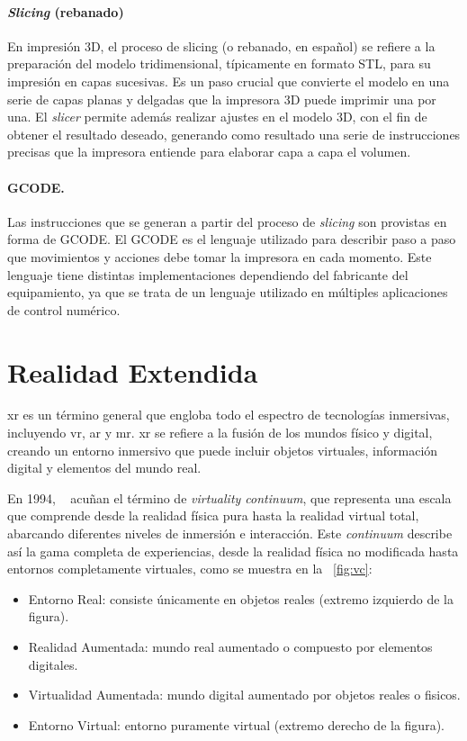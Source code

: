 \paragraph{\emph{Slicing} (rebanado)}

En impresión 3D, el proceso de slicing (o rebanado, en español) se refiere a la preparación del modelo tridimensional, típicamente en formato STL, para su impresión en capas sucesivas. Es un paso crucial que convierte el modelo en una serie de capas planas y delgadas que la impresora 3D puede imprimir una por una.
El \emph{slicer} permite además realizar ajustes en el modelo 3D, con el fin de obtener el resultado deseado, generando como resultado una serie de instrucciones precisas que la impresora entiende para elaborar capa a capa el volumen.

\paragraph{GCODE.} Las instrucciones que se generan a partir del proceso de \emph{slicing} son provistas en forma de GCODE. El GCODE es el lenguaje utilizado para describir paso a paso que movimientos y acciones debe tomar la impresora en cada momento. Este lenguaje tiene distintas implementaciones dependiendo del fabricante del equipamiento, ya que se trata de un lenguaje utilizado en múltiples aplicaciones de control numérico.

\section{Realidad Extendida}

\acrfull{xr} es un término general que engloba todo el espectro de tecnologías inmersivas, incluyendo \acrfull{vr}, \acrfull{ar} y \acrfull{mr}. \acrshort{xr} se refiere a la fusión de los mundos físico y digital, creando un entorno inmersivo que puede incluir objetos virtuales, información digital y elementos del mundo real.

En 1994, \citeauthor{Milgram1994ATO}~\cite{Milgram1994ATO} acuñan el término de \emph{virtuality continuum}, que representa una escala que comprende desde la realidad física pura hasta la realidad virtual total, abarcando diferentes niveles de inmersión e interacción. Este \emph{continuum} describe así la gama completa de experiencias, desde la realidad física no modificada hasta entornos completamente virtuales, como se muestra en la \figurename~\ref{fig:vc}:
\begin{itemize}
    \item Entorno Real: consiste únicamente en objetos reales (extremo izquierdo de la figura).
    \item Realidad Aumentada: mundo real aumentado o compuesto por elementos digitales.
    \item Virtualidad Aumentada: mundo digital aumentado por objetos reales o fisicos.
    \item Entorno Virtual: entorno puramente virtual (extremo derecho de la figura).
\end{itemize}


